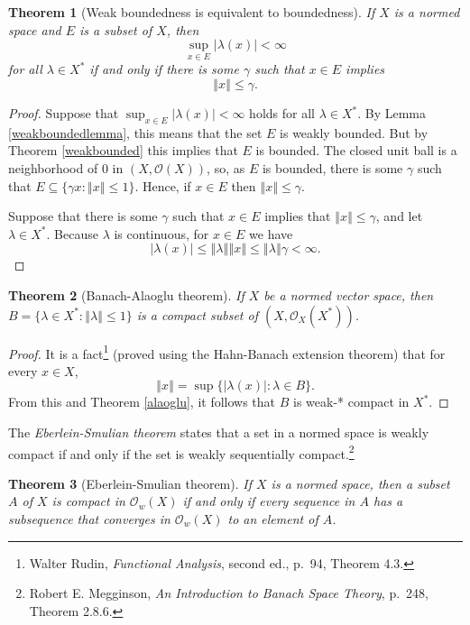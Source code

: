 \documentclass{article}
\newcommand{\norm}[1]{\left\Vert #1 \right\Vert}
\newtheorem{theorem}{Theorem}
\begin{document}
\begin{theorem}[Weak boundedness is equivalent to boundedness]
If $X$ is a normed space and $E$ is a subset of $X$, then
\[
\sup_{x \in E} |\lambda(x)| < \infty
\]
for all $\lambda \in X^*$  if and only if
 there is some $\gamma$ such that  $x \in E$ implies
\[
\norm{x} \leq \gamma.
\]
\label{normbound}
\end{theorem}
\begin{proof}
Suppose that $\sup_{x \in E} |\lambda(x)| < \infty$ holds for all $\lambda \in X^*$. By 
 Lemma \ref{weakboundedlemma}, 
 this means that the set $E$ is weakly bounded. But by Theorem \ref{weakbounded} this implies that $E$ is bounded. 
The closed unit ball is a neighborhood
of $0$ in $(X,\mathcal{O}(X))$, so, as $E$ is bounded, there is some $\gamma$ such that $E \subseteq \{\gamma x: \norm{x} \leq 1\}$.
Hence, if $x \in E$ then $\norm{x} \leq \gamma$.

Suppose that there is some $\gamma$ such that $x \in E$ implies that $\norm{x} \leq \gamma$, and let
$\lambda \in X^*$. Because $\lambda$ is continuous, for $x \in E$ we have
\[
|\lambda(x)| \leq \norm{\lambda} \norm{x} \leq \norm{\lambda} \gamma<\infty.
\]
\end{proof}






\begin{theorem}[Banach-Alaoglu theorem]
If $X$ be a normed vector space, then  $B=\{\lambda \in X^*: \norm{\lambda} \leq 1\}$  is a compact
subset of $(X,\mathcal{O}_X(X^*))$.
\end{theorem}
\begin{proof}
It is a fact\footnote{Walter Rudin, {\em Functional Analysis}, second ed., p.~94, Theorem 4.3.} (proved using the Hahn-Banach extension theorem)
that for every $x \in X$,
\[
\norm{x}=\sup \{|\lambda(x)|: \lambda \in B\}.
\]
From this and Theorem \ref{alaoglu}, it follows that
$B$ is weak-* compact in $X^*$.
\end{proof}

The {\em Eberlein-Smulian theorem} states that a set in a normed space is weakly
compact if and only if the set is weakly sequentially compact.\footnote{Robert E. Megginson,
{\em An Introduction to Banach Space Theory},
p.~248, Theorem 2.8.6.}

\begin{theorem}[Eberlein-Smulian theorem]
If $X$ is a normed space, then
a subset $A$ of $X$ is compact in $\mathcal{O}_w(X)$ if and only if every sequence in $A$ has a subsequence that
converges in $\mathcal{O}_w(X)$ to an element of $A$. 
\end{theorem}
\end{document}

